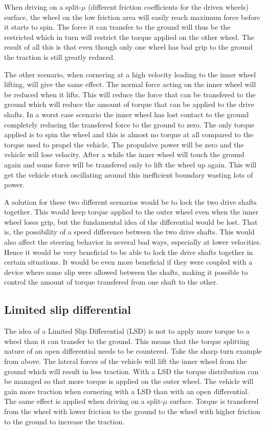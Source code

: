 When driving on a split-$ \mu $ (different friction coefficients for the driven wheels) surface, the wheel on the low friction area will easily reach maximum force before it starts to spin. The force it can transfer to the ground will thus be the restricted which in turn will restrict the torque applied on the other wheel. The result of all this is that even though only one wheel has bad grip to the ground the traction is still greatly reduced.

The other scenario, when cornering at a high velocity leading to the inner wheel lifting, will give the same effect. The normal force acting on the inner wheel will be reduced when it lifts. This will reduce the force that can be transfered to the ground which will reduce the amount of torque that can be applied to the drive shafts. In a worst case scenario the inner wheel has lost contact to the ground completely reducing the transfered force to the ground to zero. The only torque applied is to spin the wheel and this is almost no torque at all compared to the torque used to propel the vehicle. The propulsive power will be zero and the vehicle will lose velocity. After a while the inner wheel will touch the ground again and some force will be transfered only to lift the wheel up again. This will get the vehicle stuck oscillating around this inefficient boundary wasting lots of power.

A solution for these two different scenarios would be to lock the two drive shafts together. This would keep torque applied to the outer wheel even when the inner wheel loses grip, but the fundamental idea of the differential would be lost. That is, the possibility of a speed difference between the two drive shafts. This would also affect the steering behavior in several bad ways, especially at lower velocities. Hence it would be very beneficial to be able to lock the drive shafts together in certain situations. It would be even more beneficial if they were coupled with a device where some slip were allowed between the shafts, making it possible to control the amount of torque transfered from one shaft to the other.

\subsection{Limited slip differential}
The idea of a Limited Slip Differential (LSD) is not to apply more torque to a wheel than it can transfer to the ground. This means that the torque splitting nature of an open differential needs to be countered. Take the sharp turn example from above. The lateral forces of the vehicle will lift the inner wheel from the ground which will result in less traction. With a LSD the torque distribution can be managed so that more torque is applied on the outer wheel. The vehicle will gain more traction when cornering with a LSD than with an open differential. The same effect is applied when driving on a split-$ \mu $ surface. Torque is transfered from the wheel with lower friction to the ground to the wheel with higher friction to the ground to increase the traction.

